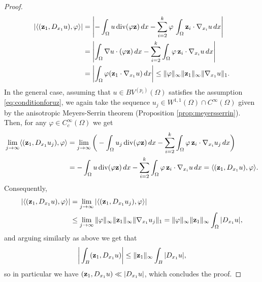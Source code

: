\documentclass[reqno,12pt]{amsart}
\def\z{{\bf z}}
\numberwithin{equation}{section}
\begin{document}
\begin{proof}
\begin{align}\label{eq:boundforsecondpairing}
|\langle (\z_1, D_{x_1} u), \varphi \rangle| &= \left|-\int_{\Omega} u \, \mathrm{div}(\varphi \z) \, dx - \sum_{i=2}^k \varphi \, \int_\Omega \z_i \cdot \nabla_{x_i} u \, dx \right| \\ 
&=  \left|\int_{\Omega} \nabla u \cdot (\varphi \z) \, dx - \sum_{i=2}^k \int_\Omega \varphi \, \z_i \cdot \nabla_{x_i} u \, dx \right| \\
&= \left|\int_{\Omega} \varphi (\z_1 \cdot \nabla_{x_1} u) \, dx \right| \leq \| \varphi \|_\infty \| \z_1 \|_\infty  \| \nabla_{x_1} u \|_1.
\end{align}
In the general case, assuming that $u \in BV^{(p_i)}(\Omega)$ satisfies the assumption \eqref{eq:conditionforuz}, we again take the sequence $u_j \in W^{1,1}(\Omega) \cap C^\infty(\Omega)$ given by the anisotropic Meyers-Serrin theorem (Proposition \ref{prop:meyersserrin}). Then, for any $\varphi \in C_c^\infty(\Omega)$ we get
\begin{align}\label{eq:approximationforsecondpairing}
\lim_{j \rightarrow \infty} \langle (\z_1, D_{x_1} u_j), \varphi \rangle &= \lim_{j \rightarrow \infty} \bigg( -\int_{\Omega} u_j \, \mathrm{div}(\varphi \z) \, dx - \sum_{i=2}^k \int_\Omega \varphi \, \z_i \cdot \nabla_{x_i} u_j \, dx \bigg) \\
&= -\int_{\Omega} u \, \mathrm{div}(\varphi \z) \, dx - \sum_{i=2}^k \int_\Omega \varphi \, \z_i \cdot \nabla_{x_i} u \, dx = \langle (\z_1, D_{x_1} u), \varphi \rangle.
\end{align}
Consequently,
\begin{align}
|\langle (\z_1, D_{x_1} u), \varphi \rangle| &= \lim_{j \rightarrow \infty} |\langle (\z_1, D_{x_1} u_j), \varphi \rangle| \\
&\leq \lim_{j \rightarrow \infty} \| \varphi \|_\infty \| \z_1 \|_\infty  \| \nabla_{x_1} u_j \|_1 = \| \varphi \|_\infty \| \z_1 \|_\infty \int_\Omega |D_{x_1} u|,
\end{align}
and arguing similarly as above we get that
\begin{equation}
\bigg\vert \int_B (\z_1, D_{x_1} u) \bigg\vert \leq \| \z_1 \|_{\infty} \int_B |D_{x_1} u|, 
\end{equation}
so in particular we have $(\z_1, D_{x_1} u) \ll \vert D_{x_1} u \vert$, which concludes the proof.
\end{proof}
\end{document}
